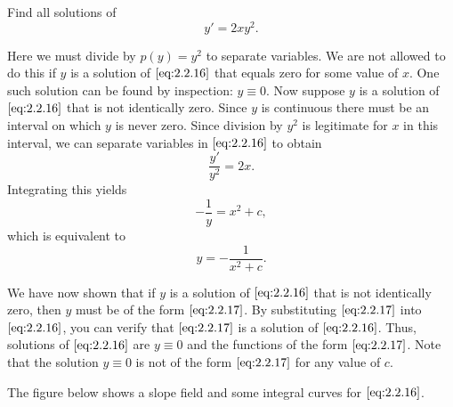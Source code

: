 \documentclass{ximera}
\begin{document}
\begin{example}\label{example:2.2.4}
Find all solutions of
\begin{equation} \label{eq:2.2.16}
y'=2xy^2.
\end{equation}
 
\begin{explanation}
Here we must divide by $p(y)=y^2$ to separate variables.
We are not allowed to do this if $y$ is a solution of $\eqref{eq:2.2.16}$ that
equals zero for some value of $x$. One such solution can be found by
inspection:  $y \equiv 0$. Now suppose $y$ is a solution
of $\eqref{eq:2.2.16}$ that is not identically zero. Since $y$ is continuous there must be an interval on which $y$ is never zero. Since division
by $y^2$ is legitimate for $x$ in this interval, we can separate
variables in $\eqref{eq:2.2.16}$ to obtain
$$
\frac{y'}{y^2}=2x.
$$
 Integrating this yields
$$
-\frac{1}{y}=x^2+c,
$$
which is equivalent to
\begin{equation} \label{eq:2.2.17}
y=-\frac{1}{x^2+c}.
\end{equation}
 
We have now shown that if $y$ is a solution of $\eqref{eq:2.2.16}$ that is
not identically zero, then $y$ must be of the form $\eqref{eq:2.2.17}$. By
substituting $\eqref{eq:2.2.17}$ into $\eqref{eq:2.2.16}$, you can verify that
$\eqref{eq:2.2.17}$ is a solution of $\eqref{eq:2.2.16}$. Thus,
 solutions of $\eqref{eq:2.2.16}$ are $y\equiv 0$ and the functions
of the form $\eqref{eq:2.2.17}$. Note that the solution $y\equiv 0$ is not of the form $\eqref{eq:2.2.17}$ for any value of $c$.
 
The figure below shows a slope field and some integral
curves for $\eqref{eq:2.2.16}$.

\begin{center}
\end{center}
 
\end{explanation}
\end{example}
 
\end{document}
